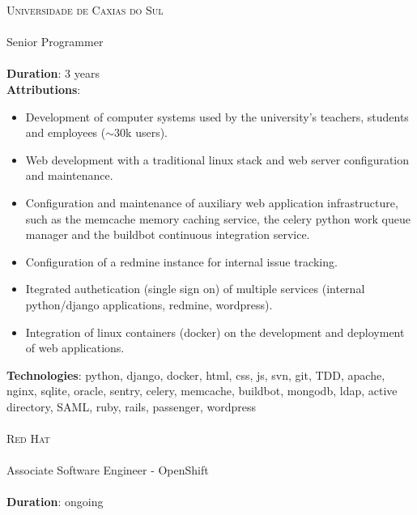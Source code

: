 \noindent
\textsc{\Large Universidade de Caxias do Sul} \\\\
Senior Programmer \\\\
\textbf{Duration}: 3 years\\
\textbf{Attributions}:
    \begin{itemize}
            \vspace{-2.5mm}
            \itemsep-1mm
        \item Development of computer systems used by the university's
            teachers, students and employees ($\sim$30k users).
        \item Web development with a traditional linux stack and web server
            configuration and maintenance.
        \item Configuration and maintenance of auxiliary web application
            infrastructure, such as the memcache memory caching service, the
            celery python work queue manager and the buildbot continuous
            integration service.
        \item Configuration of a redmine instance for internal issue tracking.
        \item Itegrated authetication (single sign on) of multiple services
            (internal python/django applications, redmine, wordpress).
        \item Integration of linux containers (docker) on the development and
            deployment of web applications.
    \end{itemize}
\textbf{Technologies}:
    python, django, docker, html, css, js, svn, git, TDD, apache, nginx,
    sqlite, oracle, sentry, celery, memcache, buildbot, mongodb, ldap, active
    directory, SAML, ruby, rails, passenger, wordpress \\\\

\noindent
\textsc{\Large Red Hat} \\\\
Associate Software Engineer - OpenShift \\\\
\textbf{Duration}: ongoing \\\\\\
